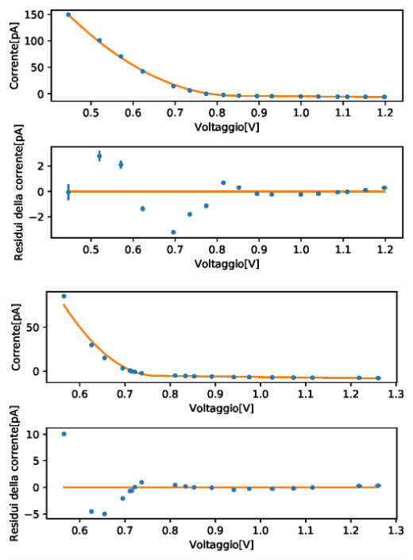 \documentclass[10pt,a4paper]{article}
\begin{document}
	\begin{minipage}{.4\linewidth}
		
		\label{tab:124}
\end{minipage}\newline\newline
\begin{minipage}{.6\linewidth}
		\centering
		\includegraphics[width=\linewidth]{immagini/545nm.eps}
		\label{fig:circuito-1}
	\end{minipage}
	\begin{minipage}{.4\linewidth}
		
		\label{tab:124}
\end{minipage}\newline\newline
\newline
\begin{minipage}{.6\linewidth}
		\centering
		\includegraphics[width=\linewidth]{immagini/577nm.eps}
		\label{fig:circuito-1}
	\end{minipage}
\end{document}
